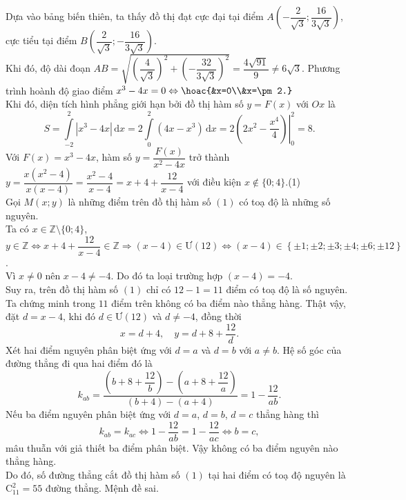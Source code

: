 \begin{ex}
{\begin{itemchoice}
\begin{center}
\begin{tikzpicture}[>=stealth]
				\end{tikzpicture}
			\end{center}
			Dựa vào bảng biến thiên, ta thấy đồ thị đạt cực đại tại điểm $A\left(-\dfrac{2}{\sqrt{3}};\dfrac{16}{3\sqrt{3}}\right)$, cực tiểu tại điểm $B\left(\dfrac{2}{\sqrt{3}};-\dfrac{16}{3\sqrt{3}}\right)$.\\
			Khi đó, độ dài đoạn $AB=\sqrt{\left(\dfrac{4}{\sqrt{3}}\right)^2 + \left(-\dfrac{32}{3\sqrt{3}}\right)^2} = \dfrac{4\sqrt{91}}{9} \neq 6\sqrt{3}$.
			\itemch Phương trình hoành độ giao điểm $x^3-4x=0\Leftrightarrow\hoac{&x=0\\&x=\pm 2.}$\\
			Khi đó, diện tích hình phẳng giới hạn bởi đồ thị hàm số $y = F(x)$ với $Ox$ là
			\[S=\displaystyle\int\limits_{-2}^2\left|x^3 - 4x\right|\mathrm{\,d}x = 2\displaystyle\int\limits_{0}^2 (4x - x^3)\mathrm{\,d}x = 2\left.\left(2x^2 - \dfrac{x^4}{4}\right)\right|_0^2 = 8.\]
			\itemch Với $F(x)=x^3 - 4x$, hàm số $y = \dfrac{F(x)}{x^2 - 4x}$ trở thành $y=\dfrac{x(x^2-4)}{x(x-4)} = \dfrac{x^2-4}{x-4}=x+4+\dfrac{12}{x-4}$ với điều kiện $x \notin \{0; 4\}$.\quad(1)\\
			Gọi $M(x;y)$ là những điểm trên đồ thị hàm số $(1)$ có toạ độ là những số nguyên.\\
			Ta có $x\in\mathbb{Z} \setminus \{0; 4\}$, $y \in \mathbb{Z} \Leftrightarrow x+4+\dfrac{12}{x-4}\in\mathbb{Z}\Rightarrow (x-4)\in\text{Ư}(12)\Leftrightarrow (x-4)\in\left\{\pm 1;\pm 2;\pm 3;\pm 4;\pm 6;\pm 12\right\}$.\\
			Vì $x \neq 0$ nên $x-4 \neq -4$. Do đó ta loại trường hợp $(x-4) = -4$.\\
			Suy ra, trên đồ thị hàm số $(1)$ chỉ có $12 - 1 = 11$ điểm có toạ độ là số nguyên.\\
			Ta chứng minh trong $11$ điểm trên không có ba điểm nào thẳng hàng. Thật vậy, đặt $d=x-4$, khi đó $d\in\text{Ư}(12)$ và $d\neq -4$, đồng thời
			\[
			x=d+4,\quad y=d+8+\dfrac{12}{d}.
			\]
			Xét hai điểm nguyên phân biệt ứng với $d=a$ và $d=b$ với $a\neq b$. Hệ số góc của đường thẳng đi qua hai điểm đó là
			\[
			k_{ab}=\dfrac{\left(b+8+\dfrac{12}{b}\right)-\left(a+8+\dfrac{12}{a}\right)}{(b+4)-(a+4)}
			=1-\dfrac{12}{ab}.
			\]
			Nếu ba điểm nguyên phân biệt ứng với $d=a$, $d=b$, $d=c$ thẳng hàng thì
			\[
			k_{ab}=k_{ac}
			\Leftrightarrow 1-\dfrac{12}{ab}=1-\dfrac{12}{ac}
			\Leftrightarrow b=c,
			\]
			mâu thuẫn với giả thiết ba điểm phân biệt. Vậy không có ba điểm nguyên nào thẳng hàng.\\
			Do đó, số đường thẳng cắt đồ thị hàm số $(1)$ tại hai điểm có toạ độ nguyên là $\mathrm{C}_{11}^2=55$ đường thẳng. Mệnh đề sai.
		\end{itemchoice}
	}
\end{ex}

